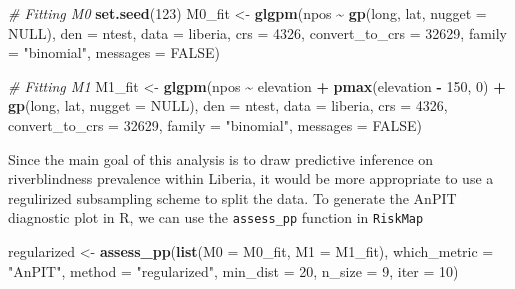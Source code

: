 \documentclass[
  letterpaper,
]{krantz}
\newenvironment{Shaded}{\begin{snugshade}}{\end{snugshade}}
\newcommand{\AttributeTok}[1]{\textcolor[rgb]{0.13,0.29,0.53}{#1}}
\newcommand{\CommentTok}[1]{\textcolor[rgb]{0.56,0.35,0.01}{\textit{#1}}}
\newcommand{\ConstantTok}[1]{\textcolor[rgb]{0.56,0.35,0.01}{#1}}
\newcommand{\DecValTok}[1]{\textcolor[rgb]{0.00,0.00,0.81}{#1}}
\newcommand{\FunctionTok}[1]{\textcolor[rgb]{0.13,0.29,0.53}{\textbf{#1}}}
\newcommand{\NormalTok}[1]{#1}
\newcommand{\OtherTok}[1]{\textcolor[rgb]{0.56,0.35,0.01}{#1}}
\newcommand{\SpecialCharTok}[1]{\textcolor[rgb]{0.81,0.36,0.00}{\textbf{#1}}}
\newcommand{\StringTok}[1]{\textcolor[rgb]{0.31,0.60,0.02}{#1}}
\begin{document}
\begin{Shaded}
\begin{Highlighting}[]
\CommentTok{\# Fitting M0}
\FunctionTok{set.seed}\NormalTok{(}\DecValTok{123}\NormalTok{)}
\NormalTok{M0\_fit }\OtherTok{\textless{}{-}} 
\FunctionTok{glgpm}\NormalTok{(npos }\SpecialCharTok{\textasciitilde{}}  \FunctionTok{gp}\NormalTok{(long, lat, }\AttributeTok{nugget =} \ConstantTok{NULL}\NormalTok{),}
      \AttributeTok{den =}\NormalTok{ ntest, }\AttributeTok{data =}\NormalTok{ liberia,}
      \AttributeTok{crs =} \DecValTok{4326}\NormalTok{,}
      \AttributeTok{convert\_to\_crs =} \DecValTok{32629}\NormalTok{,}
      \AttributeTok{family =} \StringTok{"binomial"}\NormalTok{, }\AttributeTok{messages =} \ConstantTok{FALSE}\NormalTok{)}

\CommentTok{\# Fitting M1}
\NormalTok{M1\_fit }\OtherTok{\textless{}{-}} 
\FunctionTok{glgpm}\NormalTok{(npos }\SpecialCharTok{\textasciitilde{}}\NormalTok{  elevation }\SpecialCharTok{+} \FunctionTok{pmax}\NormalTok{(elevation }\SpecialCharTok{{-}} \DecValTok{150}\NormalTok{, }\DecValTok{0}\NormalTok{) }\SpecialCharTok{+}
      \FunctionTok{gp}\NormalTok{(long, lat, }\AttributeTok{nugget =} \ConstantTok{NULL}\NormalTok{),}
      \AttributeTok{den =}\NormalTok{ ntest, }\AttributeTok{data =}\NormalTok{ liberia,}
      \AttributeTok{crs =} \DecValTok{4326}\NormalTok{,}
      \AttributeTok{convert\_to\_crs =} \DecValTok{32629}\NormalTok{,}
      \AttributeTok{family =} \StringTok{"binomial"}\NormalTok{, }\AttributeTok{messages =} \ConstantTok{FALSE}\NormalTok{)}
\end{Highlighting}
\end{Shaded}

Since the main goal of this analysis is to draw predictive inference on
riverblindness prevalence within Liberia, it would be more appropriate
to use a regulirized subsampling scheme to split the data. To generate
the AnPIT diagnostic plot in R, we can use the \texttt{assess\_pp}
function in \texttt{RiskMap}

\begin{Shaded}
\begin{Highlighting}[]
\NormalTok{regularized }\OtherTok{\textless{}{-}} 
\FunctionTok{assess\_pp}\NormalTok{(}\FunctionTok{list}\NormalTok{(}\AttributeTok{M0 =}\NormalTok{ M0\_fit, }\AttributeTok{M1 =}\NormalTok{ M1\_fit),}
          \AttributeTok{which\_metric =} \StringTok{"AnPIT"}\NormalTok{, }
          \AttributeTok{method =} \StringTok{"regularized"}\NormalTok{, }\AttributeTok{min\_dist =} \DecValTok{20}\NormalTok{,}
          \AttributeTok{n\_size =} \DecValTok{9}\NormalTok{, }\AttributeTok{iter =} \DecValTok{10}\NormalTok{)}
\end{Highlighting}
\end{Shaded}
\end{document}
